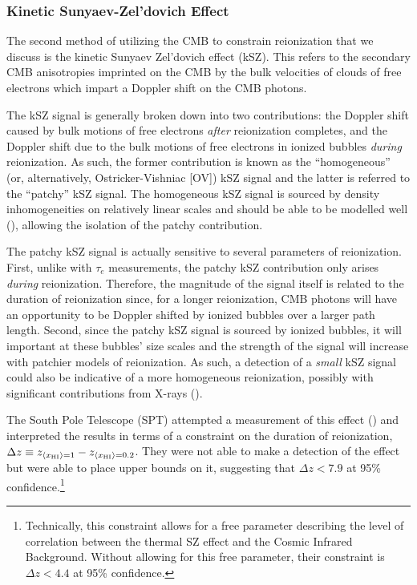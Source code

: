 \subsubsection{Kinetic Sunyaev-Zel'dovich Effect}

The second method of utilizing the CMB to constrain reionization that we discuss is the kinetic Sunyaev Zel'dovich effect (kSZ). This refers to the secondary CMB anisotropies imprinted on the CMB by the bulk velocities of clouds of free electrons which impart a Doppler shift on the CMB photons. 


The kSZ signal is generally broken down into two contributions: the Doppler shift caused by bulk motions of free electrons \textit{after} reionization completes, and the Doppler shift due to the bulk motions of free electrons in ionized bubbles \textit{during} reionization. As such, the former contribution is known as the ``homogeneous'' (or, alternatively, Ostricker-Vishniac [OV]) kSZ signal and the latter is referred to the ``patchy'' kSZ signal. The homogeneous kSZ signal is sourced by density inhomogeneities on relatively linear scales and should be able to be modelled well (\citealt{mesinger2012kinetic}), allowing the isolation of the patchy contribution.


The patchy kSZ signal is actually sensitive to several parameters of reionization. First, unlike with $\tau_{e}$ measurements, the patchy kSZ contribution only arises \textit{during} reionization. Therefore, the magnitude of the signal itself is related to the duration of reionization since, for a longer reionization, CMB photons will have an opportunity to be Doppler shifted by ionized bubbles over a larger path length. Second, since the patchy kSZ signal is sourced by ionized bubbles, it will important at these bubbles' size scales and the strength of the signal will increase with patchier models of reionization. As such, a detection of a \textit{small} kSZ signal could also be indicative of a more homogeneous reionization, possibly with significant contributions from X-rays (\citealt{visbal2012gauging}).

The South Pole Telescope (SPT) attempted a measurement of this effect (\citealt{Zahn2012}) and interpreted the results in terms of a constraint on the duration of reionization, $\Delta z \equiv z_{\langle x_{\text{HI}}\rangle=1} - z_{\langle x_{\text{HI}}\rangle = 0.2}$. They were not able to make a detection of the effect but were able to place upper bounds on it, suggesting that $\Delta z < 7.9$ at 95\% confidence.\footnote{Technically, this constraint allows for a free parameter describing the level of correlation between the thermal SZ effect and the Cosmic Infrared Background. Without allowing for this free parameter, their constraint is $\Delta z < 4.4$ at 95\% confidence.}

